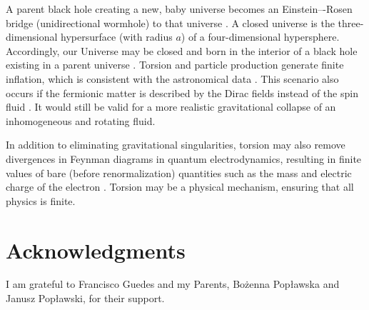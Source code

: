 \documentclass[prd,onecolumn,nofootinbib]{revtex4}
\begin{document}
A parent black hole creating a new, baby universe becomes an Einstein–-Rosen bridge (unidirectional wormhole) to that universe \cite{ER}.
A closed universe is the three-dimensional hypersurface (with radius $a$) of a four-dimensional hypersphere.
Accordingly, our Universe may be closed and born in the interior of a black hole existing in a parent universe \cite{ER}.
Torsion and particle production generate finite inflation, which is consistent with the astronomical data \cite{SD}.
This scenario also occurs if the fermionic matter is described by the Dirac fields instead of the spin fluid \cite{spin}.
It would still be valid for a more realistic gravitational collapse of an inhomogeneous and rotating fluid.

In addition to eliminating gravitational singularities, torsion may also remove divergences in Feynman diagrams in quantum electrodynamics, resulting in finite values of bare (before renormalization) quantities such as the mass and electric charge of the electron \cite{Mike}.
Torsion may be a physical mechanism, ensuring that all physics is finite.

\section*{Acknowledgments}
I am grateful to Francisco Guedes and my Parents, Bo\.{z}enna Pop{\l}awska and Janusz Pop{\l}awski, for their support.
\end{document}
